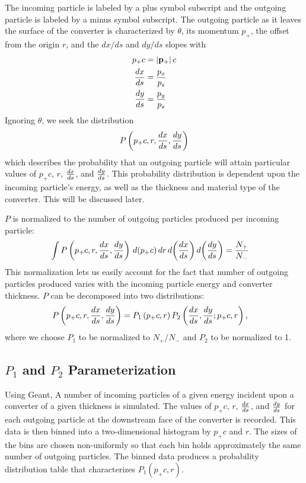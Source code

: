 \documentclass[12pt]{article}
\begin{document}
The incoming particle is labeled by a plus symbol subscript and the outgoing particle is labeled by
a minus symbol subscript. The outgoing particle as it leaves the surface of the converter is
characterized by $\theta$, its momentum $p_+$, the offset from the origin $r$, and the $dx/ds$ and
$dy/ds$ slopes with
\begin{align}
p_+ c & = \left| \mathbf{p}_+ \right| c \\
\frac{dx}{ds} & = \frac{p_x}{p_s} \\
\frac{dy}{ds} & = \frac{p_y}{p_s}
\end{align}
Ignoring $\theta$, we seek the distribution
\begin{align}
P \left( p_+ c, r, \frac{dx}{ds}, \frac{dy}{ds} \right)
\end{align}
which describes the probability that an outgoing particle will attain particular values of $p_+ c$,
$r$, $\frac{dx}{ds}$, and $\frac{dy}{ds}$. This probability distribution is dependent upon the incoming particle's
energy, as well as the thickness and material type of the converter. This will be discussed later.

$P$ is normalized to the number of outgoing particles produced per incoming particle:
\begin{align}
\int P \left( p_+ c, r, \frac{dx}{ds}, \frac{dy}{ds} \right) \, d(p_+ c) \, dr \, d \! \left( \frac{dx}{ds} \right) d \! \left( \frac{dy}{ds} \right) & = \frac{N_+}{N_-}
\end{align}
This normalization lets us easily account for the fact that number of outgoing particles produced
varies with the incoming particle energy and converter thickness. $P$ can be decomposed into two distributions:
\begin{align}
P \left( p_+ c, r, \frac{dx}{ds}, \frac{dy}{ds} \right) & = P_1 \left( p_+ c, r \right) P_2 \left( \frac{dx}{ds}, \frac{dy}{ds} ; p_+ c , r \right),
\end{align}
where we choose $P_1$ to be normalized to $N_+/N_-$ and $P_2$ to be normalized to 1.

\subsection{$P_1$ and $P_2$ Parameterization}

Using Geant\cite{geant}, A number of incoming particles of a given energy incident upon a converter
of a given thickness is simulated.  The values of $p_+ c$, $r$, $\frac{dx}{ds}$, and $\frac{dy}{ds}$ for each
outgoing particle at the downstream face of the converter is recorded. This data is then binned into
a two-dimensional histogram by $p_+ c$ and $r$. The sizes of the bins are chosen non-uniformly so
that each bin holds approximately the same number of outgoing particles. The binned data produces a
probability distribution table that characterizes $P_1(p_+c, r)$.
\end{document}
